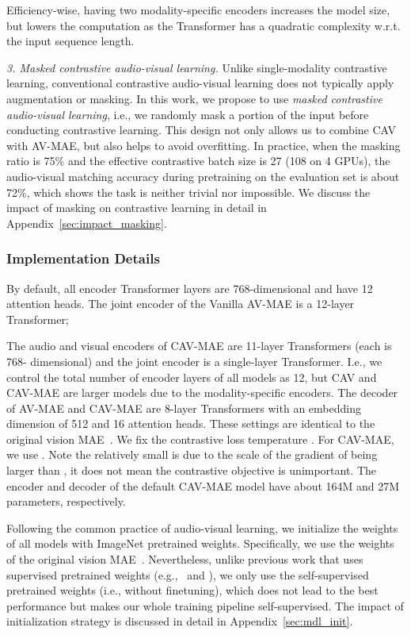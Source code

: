 \documentclass{article} \usepackage{iclr2023_conference,times}
\begin{document}
Efficiency-wise, having two modality-specific encoders increases the model size, but lowers the computation as the Transformer has a quadratic complexity w.r.t. the input sequence length.

\emph{3. Masked contrastive audio-visual learning.} Unlike single-modality contrastive learning, conventional contrastive audio-visual learning does not typically apply augmentation or masking. In this work, we propose to use \emph{masked contrastive audio-visual learning}, i.e., we randomly mask a portion of the input before conducting contrastive learning. This design not only allows us to combine CAV with AV-MAE, but also helps to avoid overfitting. In practice, when the masking ratio is 75\% and the effective contrastive batch size is 27 (108 on 4 GPUs), the audio-visual matching accuracy during pretraining on the evaluation set is about 72\%, which shows the task is neither trivial nor impossible. We discuss the impact of masking on contrastive learning in detail in Appendix~\ref{sec:impact_masking}.

\subsubsection{Implementation Details}
\label{sec:imp}

By default, all encoder Transformer layers are 768-dimensional and have 12 attention heads. The joint encoder of the Vanilla AV-MAE is a 12-layer Transformer; 

The audio and visual encoders of CAV-MAE are 11-layer Transformers (each is 768- dimensional) and the joint encoder is a single-layer Transformer. I.e., we control the total number of encoder layers of all models as 12, but CAV and CAV-MAE are larger models due to the modality-specific encoders. The decoder of AV-MAE and CAV-MAE are 8-layer Transformers with an embedding dimension of 512 and 16 attention heads. These settings are identical to the original vision MAE~\cite{he2022masked}. We fix the contrastive loss temperature . For CAV-MAE, we use . Note the relatively small  is due to the scale of the gradient of  being larger than , it does not mean the contrastive objective is unimportant. The encoder and decoder of the default CAV-MAE model have about 164M and 27M parameters, respectively.

Following the common practice of audio-visual learning, we initialize the weights of all models with ImageNet pretrained weights. Specifically, we use the weights of the original vision MAE~\cite{he2022masked}. Nevertheless, unlike previous work that uses supervised pretrained weights (e.g.,~\cite{fayek2020large} and \cite{nagrani2021attention}), we only use the self-supervised pretrained weights (i.e., without finetuning), which does not lead to the best performance but makes our whole training pipeline self-supervised. The impact of initialization strategy is discussed in detail in Appendix~\ref{sec:mdl_init}.
\end{document}
